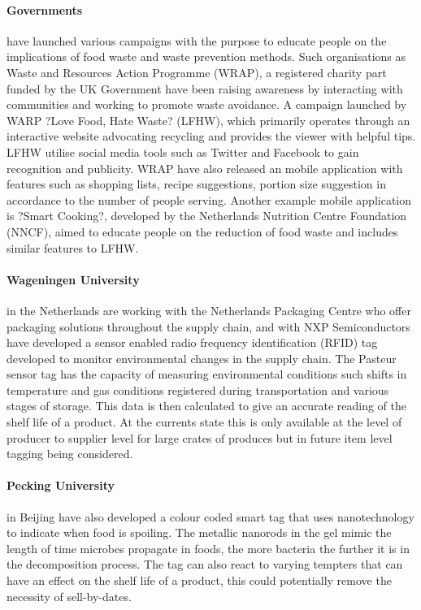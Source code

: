 \documentclass[a4paper, 11pt]{article}
\begin{document}
\paragraph{Governments} have launched various campaigns with the purpose to educate people on the implications of food waste and waste prevention methods. Such organisations as Waste and Resources Action Programme (WRAP), a registered charity part funded by the UK Government have been raising awareness by interacting with communities and working to promote waste avoidance. A campaign launched by WARP ?Love Food, Hate Waste? (LFHW), which primarily operates through an interactive website advocating recycling and provides the viewer with helpful tips. LFHW utilise social media tools such as Twitter and Facebook to gain recognition and publicity. WRAP have also released an mobile application with features such as shopping lists, recipe suggestions, portion size suggestion in accordance to the number of people serving.
Another example mobile application is ?Smart Cooking?, developed by the Netherlands Nutrition Centre Foundation (NNCF), aimed to educate people on the reduction of food waste and includes similar features to LFHW.

\paragraph{Wageningen University} in the Netherlands are working with the Netherlands Packaging Centre who offer packaging solutions throughout the supply chain, and with NXP Semiconductors have developed a sensor enabled radio frequency identification (RFID) tag developed to monitor environmental changes in the supply chain. The Pasteur sensor tag has the capacity of measuring environmental conditions such shifts in temperature and gas conditions registered during transportation and various stages of storage. This data is then calculated to give an accurate reading of the shelf life of a product. At the currents state this is only available at the level of producer to supplier level for large crates of produces but in future item level tagging being considered. 

\paragraph{Pecking University} in Beijing have also developed a colour coded smart tag that uses nanotechnology to indicate when food is spoiling. The metallic nanorods in the gel mimic the length of time microbes propagate in foods, the more bacteria the further it is in the decomposition process. The tag can also react to varying tempters that can have an effect on the shelf life of a product, this could potentially remove the necessity of sell-by-dates.
\end{document}
